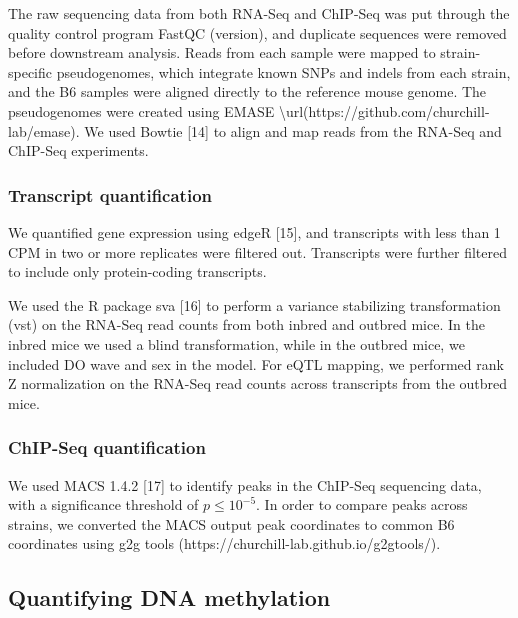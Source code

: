 \documentclass[10pt,letterpaper]{article}
\begin{document}
The raw sequencing data from both RNA-Seq and ChIP-Seq was put through
the quality control program FastQC (version), and duplicate sequences
were removed before downstream analysis. Reads from each sample were
mapped to strain-specific pseudogenomes, which integrate known SNPs and
indels from each strain, and the B6 samples were aligned directly to the
reference mouse genome. The pseudogenomes were created using EMASE
\textbackslash url(https://github.com/churchill-lab/emase). We used
Bowtie {[}14{]} to align and map reads from the RNA-Seq and ChIP-Seq
experiments.

\hypertarget{transcript-quantification}{%
\subsubsection{Transcript
quantification}\label{transcript-quantification}}

We quantified gene expression using edgeR {[}15{]}, and transcripts with
less than 1 CPM in two or more replicates were filtered out. Transcripts
were further filtered to include only protein-coding transcripts.

We used the R package sva {[}16{]} to perform a variance stabilizing
transformation (vst) on the RNA-Seq read counts from both inbred and
outbred mice. In the inbred mice we used a blind transformation, while
in the outbred mice, we included DO wave and sex in the model. For eQTL
mapping, we performed rank Z normalization on the RNA-Seq read counts
across transcripts from the outbred mice.

\hypertarget{chip-seq-quantification}{%
\subsubsection{ChIP-Seq quantification}\label{chip-seq-quantification}}

We used MACS 1.4.2 {[}17{]} to identify peaks in the ChIP-Seq sequencing
data, with a significance threshold of \(p \leq 10^{-5}\). In order to
compare peaks across strains, we converted the MACS output peak
coordinates to common B6 coordinates using g2g tools
(https://churchill-lab.github.io/g2gtools/).

\hypertarget{quantifying-dna-methylation}{%
\subsection{Quantifying DNA
methylation}\label{quantifying-dna-methylation}}
\end{document}
